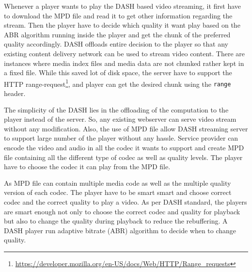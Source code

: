 Whenever a player wants to play the DASH based video streaming, it first have to download the MPD file and read it to get other information regarding the stream. Then the player have to decide which quality it want play based on the ABR algorithm running inside the player and get the chunk of the preferred quality accordingly. DASH offloads entire decision to the player so that any existing content delivery network can be used to stream video content. There are instances where media index files and media data are not chunked rather kept in a fixed file. While this saved lot of disk space, the server have to support the HTTP range-request\footnote{\url{https://developer.mozilla.org/en-US/docs/Web/HTTP/Range_requests}}, and player can get the desired chunk using the {\tt range} header.

The simplicity of the DASH lies in the offloading of the computation to the player instead of the server. So, any existing webserver can serve video stream without any modification. Also, the use of MPD file allow DASH streaming server to support large number of the player without any hassle. Service provider can encode the video and audio in all the codec it wants to support and create MPD file containing all the different type of codec as well as quality levels. The player have to choose the codec it can play from the MPD file.

As MPD file can contain multiple media code as well as the multiple quality version of each codec. The player have to be smart smart and choose correct codec and the correct quality to play a video. As per DASH standard, the players are smart enough not only to choose the correct codec and quality for playback but also to change the quality during playback to reduce the rebuffering. A DASH player run adaptive bitrate (ABR) algorithm to decide when to change quality.

